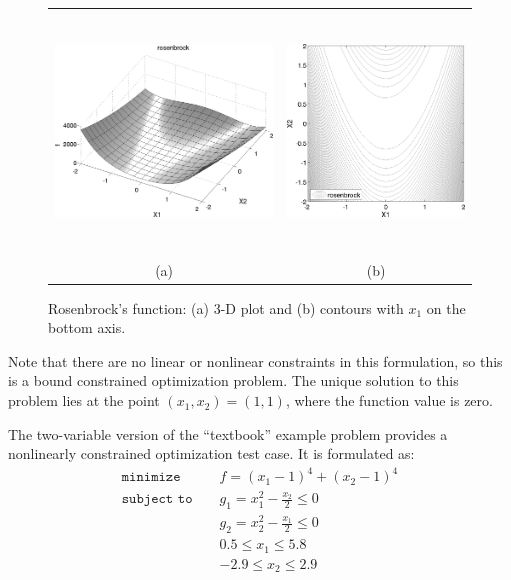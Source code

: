 \begin{figure}[htp!]
  \centering
  \begin{tabular}{cc}
  \includegraphics[height=2.5in]{images/rosen_3d_surf} &
  \includegraphics[height=2.5in]{images/rosen_2d_surf} \\
  (a) & (b) \\
  \end{tabular}
  \caption{Rosenbrock's function: (a) 3-D plot and (b) contours with
  $x_1$ on the bottom axis.}
  \label{tutorial:rosenbrock_prob}
\end{figure}

Note that there are no linear or nonlinear constraints in this
formulation, so this is a bound constrained optimization problem. The
unique solution to this problem lies at the point
$(x_1,x_2) = (1,1)$, where the function value is zero.

The two-variable version of the ``textbook'' example problem provides
a nonlinearly constrained optimization test case. It is formulated as:
\begin{eqnarray}
\texttt{minimize }
& & f = (x_1-1)^{4}+(x_2-1)^{4}     \nonumber \\
\texttt{subject to }
& & g_1 = x_1^2-\frac{x_2}{2} \le 0 \nonumber \\
& & g_2 = x_2^2-\frac{x_1}{2} \le 0 \label{tutorial:textbook_f} \\
& &  0.5 \le x_1 \le 5.8            \nonumber \\
& & -2.9 \le x_2 \le 2.9            \nonumber
\end{eqnarray}

